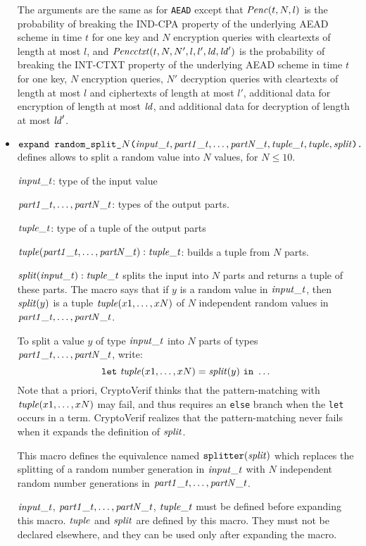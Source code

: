 \documentclass{article}
\begin{document}
\begin{itemize}
   The arguments are the same as for
   \texttt{AEAD} except that $\mathit{Penc}(t, N,
   l)$ is the probability of breaking the IND-CPA property of the
   underlying AEAD scheme in time $t$ for one key and $N$ encryption
   queries with cleartexts of length at most $l$, and
   $\mathit{Pencctxt}(t, N, N', l, l', \mathit{ld}, \mathit{ld}')$ is the
   probability of breaking the INT-CTXT property of the underlying
   AEAD scheme in time $t$ for one key, $N$ encryption queries, $N'$
   decryption queries with cleartexts of length at most $l$ and
   ciphertexts of length at most $l'$, additional data for encryption
   of length at most $\mathit{ld}$, and additional data for decryption of
   length at most $\mathit{ld}'$.

\item $\texttt{expand\ random\_split\_$N$(}\vn{input\_t}, \vn{part1\_t}, \dots,
\vn{partN\_t}, \vn{tuple\_t}, \vn{tuple}, \vn{split}\texttt{).}$ defines allows to split a random 
value into $N$ values, for $N \leq 10$.
   
  $\mathit{input\_t}$: type of the input value

  $\mathit{part1\_t}, \dots, \mathit{partN\_t}$: types of the output parts.

  $\mathit{tuple\_t}$: type of a tuple of the output parts

  $\mathit{tuple}(\mathit{part1\_t}, \dots, \mathit{partN\_t}): \mathit{tuple\_t}$: builds a tuple from $N$ parts.

  $\mathit{split}(\mathit{input\_t}): \mathit{tuple\_t}$ splits the input into $N$ parts and returns a tuple of these parts. 
  The macro says that if $y$ is a random value in $\mathit{input\_t}$, then
$\mathit{split}(y)$ is a tuple $\mathit{tuple}(x1, \dots, xN)$ of $N$
independent random values in $\mathit{part1\_t}, \dots, \mathit{partN\_t}$.


  To split a value $y$ of type $\mathit{input\_t}$ into $N$ parts 
  of types $\mathit{part1\_t}, \dots, \mathit{partN\_t}$, write:
  \[\texttt{let}\ \vn{tuple}(x1, \dots, xN) = \vn{split}(y)\ \texttt{in}\ \dots\]
  Note that a priori, CryptoVerif thinks that the pattern-matching
  with $\mathit{tuple}(x1, \dots, xN)$ may fail, and thus requires an
  \texttt{else} branch when the \texttt{let} occurs in a term.
  CryptoVerif realizes that the pattern-matching never fails when
  it expands the definition of $\mathit{split}$.
  
This macro defines the equivalence named
$\texttt{splitter}(\mathit{split})$ which replaces the splitting of a
random number generation in $\mathit{input\_t}$ with $N$ independent
random number generations in $\mathit{part1\_t}, \dots, \mathit{partN\_t}$.

$\mathit{input\_t}$, $\mathit{part1\_t}, \dots, \mathit{partN\_t}$,
$\mathit{tuple\_t}$ must be defined before expanding this macro.
$\mathit{tuple}$ and $\mathit{split}$ are defined by this macro. They must not
be declared elsewhere, and they can be used only after expanding the
macro.

\end{itemize}
\end{document}
